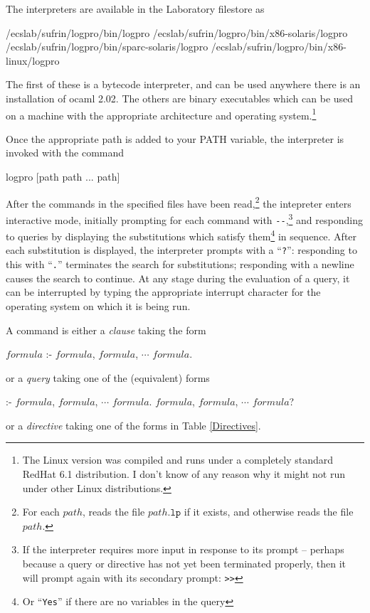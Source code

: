 %
%
%
\def\rmbox#1{\mbox{{\rm #1}}}
%
%
%
The \LOGPRO interpreters are available in the Laboratory filestore as
\begin{smalltt}
        /ecslab/sufrin/logpro/bin/logpro
        /ecslab/sufrin/logpro/bin/x86-solaris/logpro
        /ecslab/sufrin/logpro/bin/sparc-solaris/logpro
        /ecslab/sufrin/logpro/bin/x86-linux/logpro
\end{smalltt}

The first of these is a bytecode interpreter, and can be used anywhere there is an
installation of ocaml 2.02. The others are binary executables which can
be used on a machine with the appropriate architecture and operating system.\footnote{The Linux 
version was compiled and runs under a completely standard RedHat 6.1 distribution. I don't
know of any reason why it might not run under other Linux distributions.}


Once the appropriate path is added to your PATH variable, the \LOGPRO interpreter is invoked with the command
\begin{smalltt}
        logpro [path path ... path]
\end{smalltt}

After the  commands in the specified files have been read,\footnote{For each
$path$, \LOGPRO reads the file $path\mathtt{.lp}$ if it exists, and otherwise
reads the file $path$.}
the  intepreter enters interactive mode, initially prompting for
each command with \verb|--|,\footnote{If 
the interpreter requires more input in response to 
its prompt -- perhaps because a query or directive has not yet been terminated properly, then
it will prompt again with its secondary prompt: {\tt >>}} and responding to queries by
displaying the substitutions which satisfy them\footnote{Or ``{\tt Yes}'' if there are no
variables in the query} in sequence. After each substitution is displayed,
the interpreter prompts with a ``\verb|?|'': responding to
this with ``\verb|.|'' terminates the search for substitutions;
responding with a newline causes the search to continue. At any
stage during the evaluation of a query, it can be interrupted
by typing the appropriate interrupt character for the operating
system on which it is being run.





A \LOGPRO command is either a \emph{clause} taking the form
\begin{smalltt}
        \(formula\) :- \(formula\), \(formula\), \(\cdots\) \(formula\).
\end{smalltt}
or a \emph{query} taking one of the (equivalent) forms
\begin{smalltt}
        :- \(formula\), \(formula\), \(\cdots\) \(formula\).
           \(formula\), \(formula\), \(\cdots\) \(formula\)?
\end{smalltt}
or a \emph{directive} taking one of the forms in Table \ref{Directives}.

